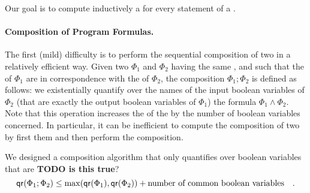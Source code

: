 Our goal is to compute inductively a  for every statement
of a .

\paragraph{Composition of Program Formulas.} The first (mild) difficulty is to
perform the sequential composition of two  in a relatively
efficient way. Given two  $\Phi_1$ and $\Phi_2$ having the
same , and such that the  of $\Phi_1$ are in correspondence with the  of $\Phi_2$, the composition $\Phi_1 ; \Phi_2$ is defined as
follows: we existentially quantify over the names of the input boolean
variables of $\Phi_2$ (that are exactly the output boolean variables of
$\Phi_1$) the formula $\Phi_1 \wedge \Phi_2$. Note that this operation
increases the  of the  by the number
of boolean variables concerned. In particular, it can be inefficient to compute
the composition of two  by first  them and
then perform the composition.


We designed a composition algorithm that only quantifies over 
boolean variables that are \textbf{TODO is this true}?
\begin{equation*}
    \mathop{\mathsf{qr}}(\Phi_1 ; \Phi_2) 
    \leq \max(\mathop{\mathsf{qr}}(\Phi_1), \mathop{\mathsf{qr}}(\Phi_2)) 
    +    \text{number of common boolean variables}
    \quad .
\end{equation*}


